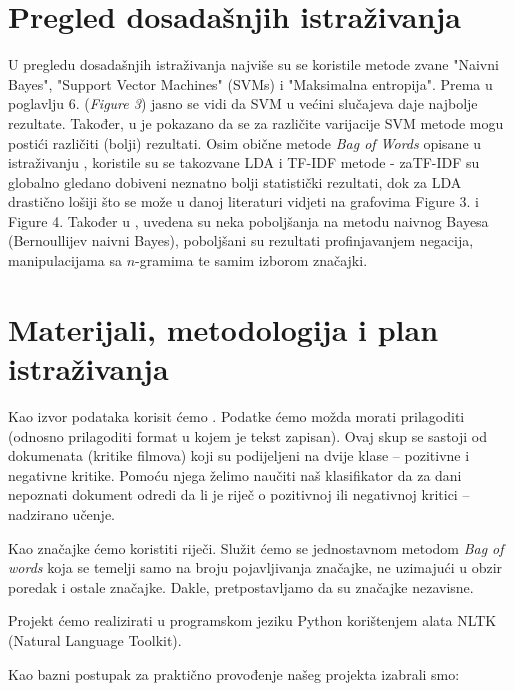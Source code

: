 \documentclass[12pt,a4paper,titlepage]{article}
\begin{document}
\section{Pregled dosadašnjih istraživanja}

U pregledu dosadašnjih istraživanja najviše su se koristile metode zvane "Naivni Bayes", "Support Vector Machines" (\textsc{SVM}s) i "Maksimalna entropija". Prema \cite{Pang:2002:TUS:1118693.1118704} u poglavlju 6. (\textit{Figure 3}) jasno se vidi da \textsc{SVM} u većini slučajeva daje najbolje rezultate. Također, u \cite{stan} je pokazano da se za različite varijacije \textsc{SVM} metode mogu postići različiti (bolji) rezultati. Osim obične metode \textit{Bag of Words} opisane u istraživanju \cite{maas-EtAl:2011:ACL-HLT2011}, koristile su se takozvane \textsc{LDA} i \textsc{TF-IDF} metode - za\textsc{TF-IDF} su globalno gledano dobiveni neznatno bolji statistički rezultati, dok za \textsc{LDA} drastično lošiji što se može u danoj literaturi vidjeti na grafovima Figure 3. i Figure 4. Također u \cite{SaLAD:LAS}, uvedena su neka poboljšanja na metodu naivnog Bayesa (Bernoullijev naivni Bayes), poboljšani su rezultati profinjavanjem negacija, manipulacijama sa $n$-gramima te samim izborom značajki.

\section{Materijali, metodologija i plan istraživanja}

Kao izvor podataka korisit ćemo \cite{dataset}. Podatke ćemo možda morati prilagoditi (odnosno prilagoditi format u kojem je tekst zapisan). Ovaj skup se sastoji od dokumenata (kritike filmova) koji su podijeljeni na dvije klase -- pozitivne i negativne kritike. Pomoću njega želimo naučiti naš klasifikator da za dani nepoznati dokument odredi da li je riječ o pozitivnoj ili negativnoj kritici -- nadzirano učenje.

Kao značajke ćemo koristiti riječi. Služit ćemo se jednostavnom metodom \textit{Bag of words} koja se temelji samo na broju pojavljivanja značajke, ne uzimajući u obzir poredak i ostale značajke. Dakle, pretpostavljamo da su značajke nezavisne.

Projekt ćemo realizirati u programskom jeziku Python korištenjem alata NLTK (Natural Language Toolkit). 

Kao bazni postupak za praktično provođenje našeg projekta izabrali smo:
\end{document}
